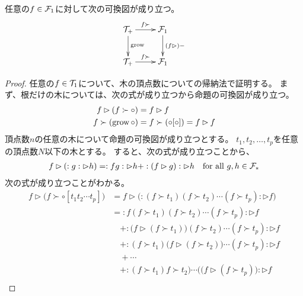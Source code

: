 	\begin{proposition}\label{prop:木の成長と微分もどきのべき乗} %
		任意の$f\in{\mathcal{F}}_1$に対して次の可換図が成り立つ。
		\begin{equation*}\xymatrix{
			\mycal{T}_+ \ar[d]^{\myop{grow}} \ar[r]^{f\succ}
				& \mycal{F}_1 \ar[d]^{(f\rhd)-} \\
			\mycal{T}_+ \ar[r]^{f\succ} &  \mycal{F}_1 \\
		}\end{equation*}
	\end{proposition} %
	\begin{proof} %
		任意の$f\in{\mathcal{T}}_1$について、木の頂点数についての帰納法で証明する。
		まず、根だけの木については、次の式が成り立つから命題の可換図が成り立つ。
		\begin{equation*}\begin{split} %
			f\rhd(f\succ\circ) &= f\rhd f \\
			f\succ(\myop{grow}\circ) &= f\succ(\circ[\circ])= f\rhd f
		\end{split}\end{equation*} %
		頂点数$n$の任意の木について命題の可換図が成り立つとする。
		$t_1,t_2,\dots,t_p$を任意の頂点数$N$以下の木とする。
		すると、次の式が成り立つことから、
		\begin{equation*}\begin{split} %
			f\rhd(:g:\rhd h) = :fg:\rhd h + :(f\rhd g):\rhd h
			\quad\text{for all }g,h\in \mycal{F}_*
		\end{split}\end{equation*} %
		次の式が成り立つことがわかる。
		\begin{equation*}\begin{split} %
			f\rhd\bigl(f\succ\circ[t_1t_2\cdots t_p]\bigr)
			&= f\rhd\bigl(:(f\succ t_1)(f\succ t_2)\cdots(f\succ t_p):\rhd f\bigr) \\
			&= :f(f\succ t_1)(f\succ t_2)\cdots(f\succ t_p):\rhd f \\
			&\quad + :\bigl(f\rhd(f\succ t_1)\bigr)(f\succ t_2)\cdots(f\succ t_p):\rhd f \\
			&\quad + :(f\succ t_1)\bigl(f\rhd(f\succ t_2)\bigr)\cdots(f\succ t_p):\rhd f \\
			&\quad + \cdots \\
			&\quad + :(f\succ t_1)f\succ t_2)\cdots(\bigl(f\rhd(f\succ t_p)\bigr):\rhd f \\
		\end{split}\end{equation*} %

\end{proof}

